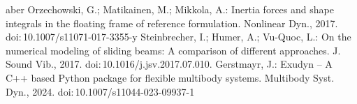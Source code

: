 \documentclass{acmd2026_abstract}
\begin{document}
\begin{thebibliography}{aber}
  Orzechowski, G.; Matikainen, M.; Mikkola, A.: 
  Inertia forces and shape integrals in the floating frame of reference formulation.
  \newblock Nonlinear Dyn., 2017.
  \newblock doi:\,10.1007/s11071-017-3355-y
  Steinbrecher, I.; Humer, A.; Vu-Quoc, L.: 
  On the numerical modeling of sliding beams: A comparison of different approaches.
  \newblock J. Sound Vib., 2017.
  \newblock doi:\,10.1016/j.jsv.2017.07.010.
  Gerstmayr, J.: 
  Exudyn – A C++ based Python package for flexible multibody systems.
  \newblock Multibody Syst. Dyn., 2024.
  \newblock doi:\,10.1007/s11044-023-09937-1
\end{thebibliography}
\end{document}
